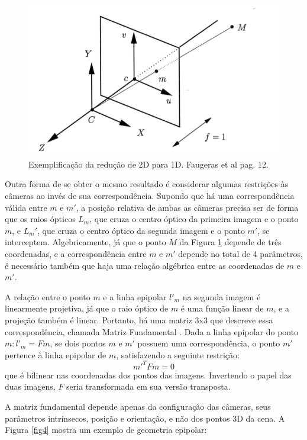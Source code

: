 \begin{figure}[H]
	\centering
		\includegraphics{Imagens/figura2-3.png}
	\caption{Exemplificação da redução de 2D para 1D. Faugeras et al \cite{Faugeras-Geometry} pag. 12.}
	\label{fig3}
\end{figure}

Outra forma de se obter o mesmo resultado é considerar algumas restrições às câmeras ao invés de sua correspondência. Supondo que há uma correspondência válida entre $m$ e $m'$, a posição relativa de ambas as câmeras precisa ser de forma que os raios ópticos $L_{m}$, que cruza o centro óptico da primeira imagem e o ponto $m$, e $L_{m}'$, que cruza o centro óptico da segunda imagem e o ponto $m'$, se interceptem. Algebricamente, já que o ponto $M$ da Figura \ref{fig3} depende de três coordenadas, e a correspondência entre $m$ e $m'$ depende no total de 4 parâmetros, é necessário também que haja uma relação algébrica entre as coordenadas de $m$ e $m'$.

A relação entre o ponto $m$ e a linha epipolar $l'_{m}$ na segunda imagem é linearmente projetiva, já que o raio óptico de $m$ é uma função linear de $m$, e a projeção também é linear. Portanto, há uma matriz 3x3 que descreve essa correspondência, chamada Matriz Fundamental \cite{Faugeras-Geometry}. Dada a linha epipolar do ponto $m: l'_{m} = Fm$, se dois pontos $m$ e $m'$ possuem uma correspondência, o ponto $m'$ pertence à linha epipolar de $m$, satisfazendo a seguinte restrição: 
\begin{equation}\label{eq5}m'^{T}Fm = 0\end{equation} que é bilinear nas coordenadas dos pontos das imagens. Invertendo o papel das duas imagens, $F$ seria transformada em sua versão transposta.

A matriz fundamental depende apenas da configuração das câmeras, seus parâmetros intrínsecos, posição e orientação, e não dos pontos 3D da cena. A Figura \ref{fig4} mostra um exemplo de geometria epipolar:

